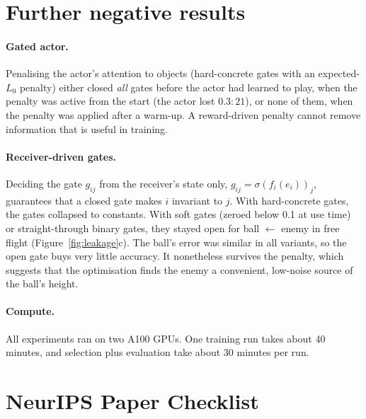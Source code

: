 \documentclass{article}
\begin{document}
\section{Further negative results}
\label{app:negative}

\paragraph{Gated actor.} Penalising the actor's attention to objects (hard-concrete gates with an
expected-$L_0$ penalty) either closed \emph{all} gates before the actor had learned to play, when the
penalty was active from the start (the actor lost $0.3{:}21$), or none of them, when the penalty was
applied after a warm-up. A reward-driven penalty cannot remove information that is useful in training.

\paragraph{Receiver-driven gates.} Deciding the gate $g_{ij}$ from the receiver's state only,
$g_{ij}=\sigma(f_i(e_i))_j$, guarantees that a closed gate makes $i$ invariant to $j$. With
hard-concrete gates, the gates collapsed to constants. With soft gates (zeroed below 0.1 at use time)
or straight-through binary gates, they stayed open for ball $\leftarrow$ enemy in free flight
(Figure~\ref{fig:leakage}c). The ball's error was similar in all variants, so the open gate buys very
little accuracy. It nonetheless survives the penalty, which suggests that the optimisation finds the
enemy a convenient, low-noise source of the ball's height.

\paragraph{Compute.} All experiments ran on two A100 GPUs. One training run takes about 40 minutes, and
selection plus evaluation take about 30 minutes per run.

\newpage
\section*{NeurIPS Paper Checklist}
\end{document}
